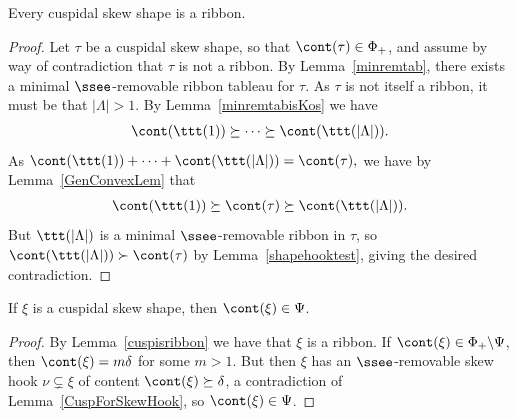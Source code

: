 \begin{lemma}\label{cuspisribbon}
Every cuspidal skew shape is a ribbon.
\end{lemma}
\begin{proof}
Let \(\tau\) be a cuspidal skew shape, so that \(\cont(\tau) \in \Phi_+\), and assume by way of contradiction that \(\tau\) is not a ribbon. By Lemma~\ref{minremtab}, there exists a minimal \(\ssee\)-removable ribbon tableau for \(\tau\). As \(\tau\) is not itself a ribbon, it must be that \(|\Lambda|>1\). By Lemma~\ref{minremtabisKos} we have 
\begin{align*}
\cont(\ttt(1)) \succeq \cdots \succeq \cont(\ttt(|\Lambda|)).
\end{align*}
As
\(
\cont(\ttt(1)) + \cdots + \cont(\ttt(|\Lambda|)) = \cont(\tau), 
\)
we have by Lemma~\ref{GenConvexLem} that
\begin{align*}
\cont(\ttt(1)) \succeq \cont(\tau)\succeq \cont(\ttt(|\Lambda|)).
\end{align*}
But \(\ttt(|\Lambda|)\) is a minimal \(\ssee\)-removable ribbon in \(\tau\), so \(\cont(\ttt(|\Lambda|)) \succ \cont(\tau)\) by Lemma~\ref{shapehooktest}, giving the desired contradiction.
\end{proof}

\begin{lemma}\label{cuspisindiv}
If \(\xi\) is a cuspidal skew shape, then \(\cont(\xi) \in \Psi\).
\end{lemma}
\begin{proof}
By Lemma~\ref{cuspisribbon} we have that \(\xi\) is a ribbon. If \(\cont(\xi) \in \Phi_+ \backslash \Psi\), then \(\cont(\xi) = m\delta\) for some \(m >1\). But then \(\xi\) has an \(\ssee\)-removable skew hook \(\nu \subsetneq \xi\) of content \(\cont(\xi) \succeq \delta\), a contradiction of Lemma~\ref{CuspForSkewHook}, so \(\cont(\xi) \in \Psi\).
\end{proof}
